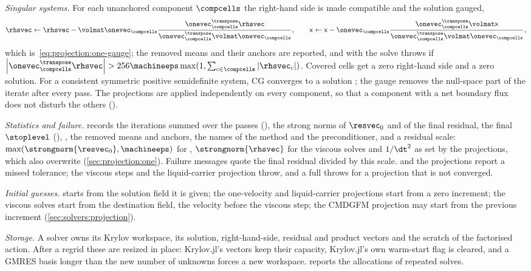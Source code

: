 \emph{Singular systems.} For each unanchored component $\compcells$ the
right-hand side is made compatible and the solution gauged,
\begin{equation}\label{eq:solvers:compatibility}
  \rhsvec\leftarrow\rhsvec-\volmat\onevec_{\compcells}\frac{\onevec_{\compcells}^{\transpose}\rhsvec}{\onevec_{\compcells}^{\transpose}\volmat\onevec_{\compcells}},
  \qquad
  \mathsf{x}\leftarrow\mathsf{x}-\onevec_{\compcells}\frac{\onevec_{\compcells}^{\transpose}\volmat\mathsf{x}}{\onevec_{\compcells}^{\transpose}\volmat\onevec_{\compcells}},
\end{equation}
which is~\cref{eq:projection:one-gauge}; the removed means and their anchors
are reported, and with  the solve throws if
$\abs{\onevec_{\compcells}^{\transpose}\rhsvec}>256\machineeps\max(1,\sum_{c\in\compcells}\abs{\rhsvec_c})$.
Covered cells get a zero right-hand side and a zero solution. For a consistent
symmetric positive semidefinite system, CG converges to a solution
\cite{kaasschieter1988}; the gauge removes the null-space part of the iterate
after every pass. The projections are applied independently on every
component, so that a component with a net boundary flux does not disturb the
others ().

\emph{Statistics and failure.}  records the
iterations summed over the passes (), the strong norms of
$\resvec_0$ and of the final residual, the final $\stoplevel$
(), , the removed means and anchors, the
names of the method and the preconditioner, and a residual scale:
$\max(\strongnorm{\resvec_0},\machineeps)$ for ,
$\strongnorm{\rhsvec}$ for the viscous solves and $1/\dt^2$ as set by the
projections, which also overwrite 
(\cref{sec:projection:one}). Failure messages quote the final residual divided
by this scale.  and the projections report a missed tolerance;
the viscous steps and the liquid-carrier projection throw, and a full
 throws for a projection that is not converged.

\emph{Initial guesses.}  starts from the solution field it is
given; the one-velocity and liquid-carrier projections start from a zero
increment; the viscous solves start from the destination field, the velocity
before the viscous step; the CMDGFM projection may start from the previous
increment (\cref{sec:solvers:projection}).

\emph{Storage.} A solver owns its Krylov workspace, its solution,
right-hand-side, residual and product vectors and the scratch of the
factorised action. After a regrid these are resized in place: Krylov.jl's
vectors keep their capacity, Krylov.jl's own warm-start flag is cleared, and
a GMRES basis longer than the new number of unknowns forces a new workspace.
 reports the allocations of repeated solves.

